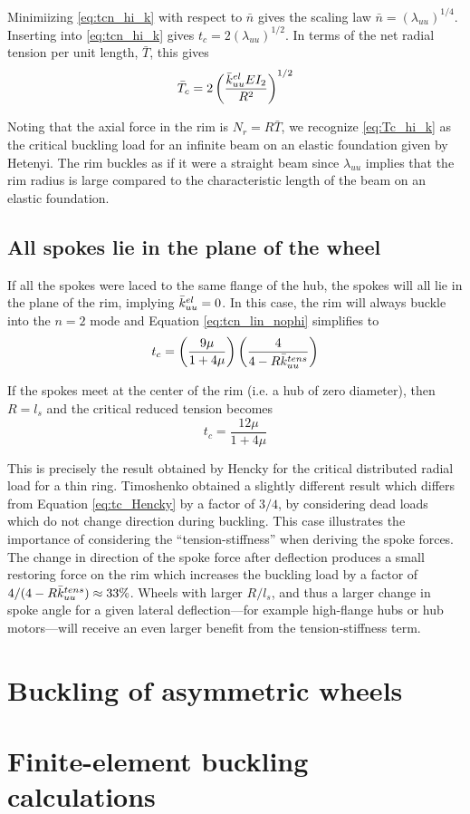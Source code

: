 \documentclass[\rootdir/thesis.tex]{subfiles}
\begin{document}
Minimiizing \eqref{eq:tcn_hi_k} with respect to $\bar{n}$ gives the scaling law $\bar{n}=(\lambda_{uu})^{1/4}$. Inserting into \eqref{eq:tcn_hi_k} gives $t_c = 2(\lambda_{uu})^{1/2}$. In terms of the net radial tension per unit length, $\bar{T}$, this gives
\begin{equation}
\label{eq:Tc_hi_k}
\bar{T}_c = 2 \left(\frac{\bar{k}_{uu}^{el}EI_2}{R^2}\right)^{1/2}
\end{equation}

Noting that the axial force in the rim is $N_r=R\bar{T}$, we recognize \eqref{eq:Tc_hi_k} as the critical buckling load for an infinite beam on an elastic foundation given by Hetenyi\cite{Hetenyi}. The rim buckles as if it were a straight beam since $\lambda_{uu}$ implies that the rim radius is large compared to the characteristic length of the beam on an elastic foundation.

\subsection{All spokes lie in the plane of the wheel}

If all the spokes were laced to the same flange of the hub, the spokes will all lie in the plane of the rim, implying $\bar{k}_{uu}^{el}=0$. In this case, the rim will always buckle into the $n=2$ mode and Equation \eqref{eq:tcn_lin_nophi} simplifies to
\begin{equation}
t_c = \left(\frac{9\mu}{1 + 4\mu}\right)\left(\frac{4}{4 - R\bar{k}_{uu}^{tens}}\right)
\end{equation}

If the spokes meet at the center of the rim (i.e. a hub of zero diameter), then $R=l_s$ and the critical reduced tension becomes
\begin{equation}
\label{eq:tc_Hencky}
t_c = \frac{12\mu}{1 + 4\mu}
\end{equation}

This is precisely the result obtained by Hencky for the critical distributed radial load for a thin ring\cite{Henky}. Timoshenko obtained a slightly different result which differs from Equation \eqref{eq:tc_Hencky} by a factor of  $3/4$, by considering dead loads which do not change direction during buckling. This case illustrates the importance of considering the ``tension-stiffness'' when deriving the spoke forces. The change in direction of the spoke force after deflection produces a small restoring force on the rim which increases the buckling load by a factor of $4/(4 - R\bar{k}_{uu}^{tens}) \approx 33\%$. Wheels with larger $R/l_s$, and thus a larger change in spoke angle for a given lateral deflection---for example high-flange hubs or hub motors---will receive an even larger benefit from the tension-stiffness term.

\section{Buckling of asymmetric wheels}

\section{Finite-element buckling calculations}
\end{document}
